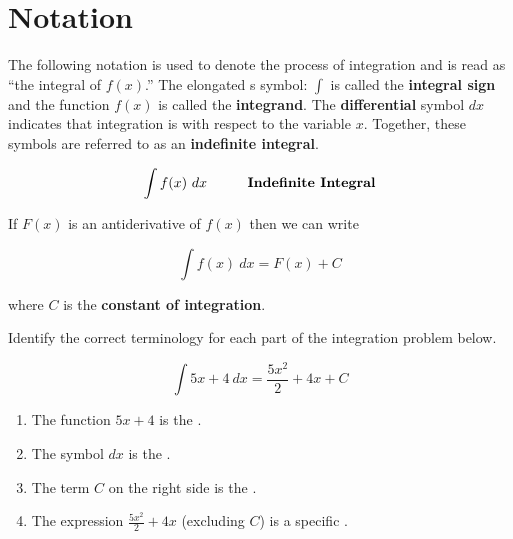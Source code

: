 \documentclass{ximera}
\begin{document}
\section*{Notation}

The following notation is used to denote the process of integration and is read as
``the integral of $f(x)$.''  The elongated s symbol: $\textstyle \int$ is called the \textbf{integral sign} and
the function $f(x)$ is called the \textbf{integrand}.  The \textbf{differential} symbol $dx$
indicates that integration is with respect to the variable $x.$  Together, these symbols are referred to as
an \textbf{indefinite integral}.

\[ \int f(x) \ dx  \hspace{0.4in} \textbf{Indefinite Integral}\]


If $F(x)$ is an antiderivative of $f(x)$ then we can write

\[ \int f(x) \ dx = F(x) + C \]

where $C$ is the \textbf{constant of integration}.


\begin{problem}
Identify the correct terminology for each part of the integration problem below.

\[ \int 5x + 4 \ dx = \frac{5x^2}{2} + 4x + C \]

\begin{enumerate}
    \item The function $5x + 4$ is the
    .

    \item The symbol $dx$ is the
    .

    \item The term $C$ on the right side is the
    .

    \item The expression $\displaystyle \frac{5x^2}{2} + 4x$ (excluding $C$) is a specific
    .
\end{enumerate}
\end{problem}
\end{document}
